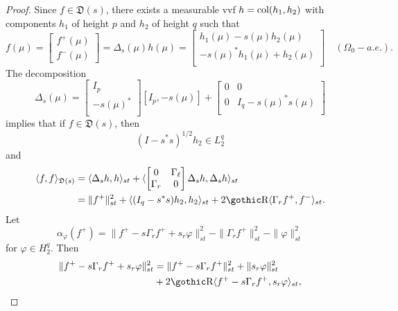 \documentclass[12pt,twoside,a4paper]{amsart}
\theoremstyle{definition}
\numberwithin{equation}{section}
\begin{document}
\begin{proof}
Since $f\in{{\mathfrak D}}(s)$, there exists a measurable vvf $h=\textup{col}(h_1,h_2)$ 
with components $h_1$ of height $p$ and $h_2$ of height $q$ such that
\[
  f(\mu)=\begin{bmatrix}f^+(\mu)\\ f^-(\mu)\end{bmatrix}
=\Delta_s(\mu)h(\mu)=\begin{bmatrix}
    h_1(\mu) -s(\mu)h_2(\mu) \\
    -s(\mu)^*h_1(\mu) +h_2(\mu)\\
  \end{bmatrix}\quad (\Omega_0 -a.e.).
\]
The decomposition
\[
\Delta_s(\mu)=\begin{bmatrix}
  I_p \\
  -s(\mu)^*\\
\end{bmatrix}[I_p,-s(\mu)]+\begin{bmatrix}
  0 & 0 \\
  0 & I_q-s(\mu)^*s(\mu)\\
\end{bmatrix}
\]
implies that if $f\in{{\mathfrak D}}(s)$, then
\[
(I-s^*s)^{1/2}h_2\in L_2^q
\]
and
\begin{equation}\label{eq:1.38A}
\begin{split}
\langle f,f\rangle_{{{\mathfrak D}}(s)}
&=\langle\Delta_s h,h\rangle_{st}+\langle\begin{bmatrix}
  0 & \Gamma_{\ell} \\
  \Gamma_r & 0 \\
\end{bmatrix}\Delta_s h,\Delta_s h\rangle_{st}\\
&=\|f^+\|_{st}^2+\langle(I_q-s^*s)h_2,h_2\rangle_{st}+2{\mbox{\gothic\char'122}}
\langle\Gamma_r f^+, f^-\rangle_{st}.
\end{split}
\end{equation}
Let
$$
\alpha_\varphi(f^+)= \|f^+ -s\Gamma_r f^+ +s_r \varphi\|_{st}^2
-\|\Gamma_r f^+\|_{st}^2-\|\varphi\|_{st}^2
$$
for $\varphi\in H_2^q$.  Then
\begin{equation}\label{eq:1.39A}
\begin{split}
  \|f^+ -s\Gamma_r f^+ +s_r \varphi\|_{st}^2
  &=\|f^+ -s\Gamma_r f^+\|_{st}^2 +\|s_r \varphi\|_{st}^2\\
  & +2{\mbox{\gothic\char'122}}\langle f^+ -s\Gamma_r f^+ ,s_r \varphi\rangle_{st},
\end{split}
\end{equation}

\end{proof}
\end{document}
